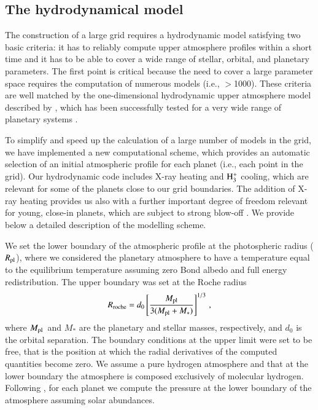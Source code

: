 \documentclass{aa}
\def\hhh{{\rm H_3^+}}
\def\Teq{$T_{\rm eq}$}
\def\Rpl{$R_{\rm pl}$}
\def\Mpl{$M_{\rm pl}$}
\begin{document}
\subsection{The hydrodynamical model}\label{sec:modelling}
%
The construction of a large grid requires a hydrodynamic model
satisfying two basic criteria: it has to reliably compute upper
atmosphere profiles within a short time and it has to be able to
cover a wide range of stellar, orbital, and planetary parameters.
The first point is critical because the need to cover a large
parameter space requires the computation of numerous models (i.e.,
$>$1000). These criteria {are well matched} by the one-dimensional
hydrodynamic upper atmosphere model described by
\citet{erkaev2016}, which has been successfully tested for a very
wide range of planetary systems
\citep[e.g.,][]{lammer2013,lammer2016,erkaev2013,erkaev2014,erkaev2015,erkaev2016,erkaev2017,fossati2017,cubillos2017a,cubillos2017b}.

To simplify and speed up the calculation of a large number of models in the grid, we have implemented a new computational scheme, which provides an automatic selection of an initial atmospheric profile for each planet (i.e., each point in the grid). Our hydrodynamic code includes X-ray heating and $\hhh$ cooling, which are relevant for some of the planets close to our grid boundaries. The addition of X-ray heating provides us also with a further important degree of freedom relevant for young, close-in planets, which are subject to strong blow-off \citep[e.g.,][]{kubyshkina2018}. We provide below a detailed description of the modelling scheme.

We set the lower boundary of the atmospheric profile at the photospheric radius (\Rpl), where we considered the planetary atmosphere to have a temperature equal to the equilibrium temperature \citep[\Teq; see][]{fossati2017} assuming zero Bond albedo and full energy redistribution. The upper boundary was set at the Roche radius
%
\begin{equation}\label{eqn:Rroche}
R_{\rm roche} = d_0\left[\frac{M_{\rm pl}}{3(M_{\rm pl}+M_*)}\right]^{1/3}\,,
\end{equation}
%
where \Mpl\ and $M_*$ are the planetary and stellar masses,
respectively, and $d_0$ is the orbital separation. The boundary
conditions at the upper limit were set to be free, that is {the
position at which} the radial derivatives of the computed
quantities become zero. We assume a pure hydrogen atmosphere and
that at the lower boundary the atmosphere is composed exclusively
of molecular hydrogen. Following \citet{fossati2017}, for each
planet we compute the pressure at the lower boundary of the
atmosphere assuming solar abundances.
\end{document}
